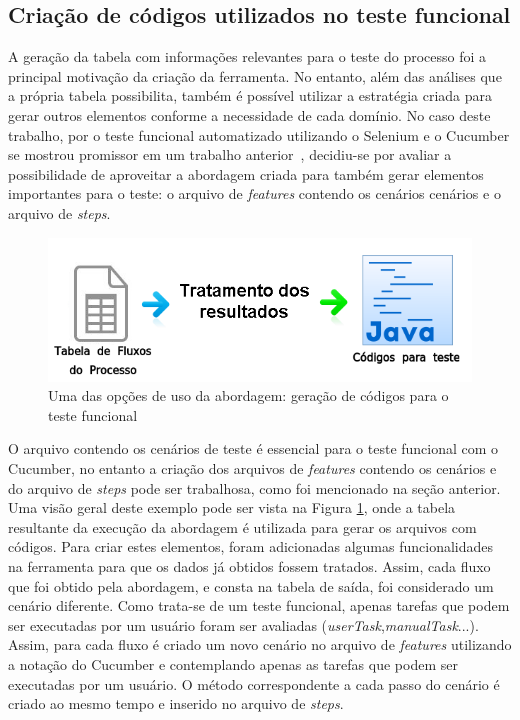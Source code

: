 \documentclass[12pt]{article}
\begin{document}


\subsection{Criação de códigos utilizados no teste funcional}

A geração da tabela com informações relevantes para o teste do processo foi a principal motivação da criação da ferramenta. No entanto, além das análises que a própria tabela possibilita, também é possível utilizar a estratégia criada para gerar outros elementos conforme a necessidade de cada domínio. No caso deste trabalho, por o teste funcional automatizado utilizando o Selenium e o Cucumber se mostrou promissor em um trabalho anterior~\cite{sbqs2015}, decidiu-se por avaliar a possibilidade de aproveitar a abordagem criada para também gerar elementos importantes para o teste: o arquivo de \emph{features} contendo os cenários cenários e o arquivo de \emph{steps}.

\begin{figure}[ht]
\centering
\includegraphics[width=.9\textwidth]{figuras/abordagem2.png}
\caption{Uma das opções de uso da abordagem: geração de códigos para o teste funcional}
\label{fig:abordagem2}
\end{figure}

O arquivo contendo os cenários de teste é essencial para o teste funcional com o Cucumber, no entanto a criação dos arquivos de \emph{features} contendo os cenários e do arquivo de \emph{steps} pode ser trabalhosa, como foi mencionado na seção anterior. Uma visão geral deste exemplo pode ser vista na Figura \ref{fig:abordagem2}, onde a tabela resultante da execução da abordagem é utilizada para gerar os arquivos com códigos. Para criar estes elementos, foram adicionadas algumas funcionalidades na ferramenta para que os dados já obtidos fossem tratados. Assim, cada fluxo que foi obtido pela abordagem, e consta na tabela de saída, foi considerado um cenário diferente. Como trata-se de um teste funcional, apenas tarefas que podem ser executadas por um usuário foram ser avaliadas (\emph{userTask},\emph{manualTask}...). Assim, para cada fluxo é criado um novo cenário no arquivo de \emph{features} utilizando a notação do Cucumber e contemplando apenas as tarefas que podem ser executadas por um usuário. O método correspondente a cada passo do cenário é criado ao mesmo tempo e inserido no arquivo de \emph{steps}. %
\end{document}
